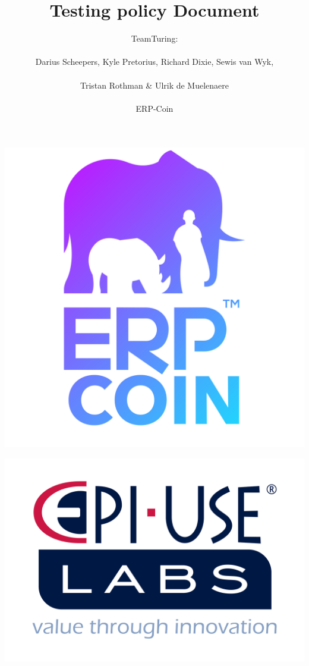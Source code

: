 \documentclass{article}
\title{Testing policy Document}
\author{TeamTuring:\\\\Darius Scheepers, Kyle Pretorius, Richard Dixie, Sewis van Wyk,\\\\ Tristan Rothman \& Ulrik de Muelenaere\\\\ ERP-Coin}
\date{}
\begin{document}
\maketitle
\begin{center}
\includegraphics[scale=0.1]{erp-logo.png}
\end{center}

\begin{center}
\includegraphics[scale=0.15]{epi-use.png}
\end{center}
\end{document}
